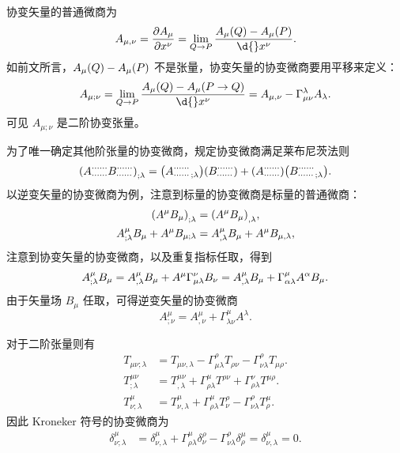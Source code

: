 \documentclass[UTF8, 12pt, a4paper, oneside, onecolumn, fontset=none]{ctexart}
\begin{document}
协变矢量的普通微商为
\begin{equation}
A_{\mu,\nu}=\frac{\partial{}A_{\mu}}{\partial{}x^{\nu}}=\lim_{Q\to P}\frac{A_{\mu}\mleft(Q\mright)-A_{\mu}\mleft(P\mright)}{\d{}x^{\nu}}.
\end{equation}
如前文所言，$A_{\mu}\mleft(Q\mright)-A_{\mu}\mleft(P\mright)$ 不是张量，协变矢量的协变微商要用平移来定义：
\begin{equation}
A_{\mu;\nu}=\lim_{Q\to P}\frac{A_{\mu}\mleft(Q\mright)-A_{\mu}\mleft(P\to Q\mright)}{\d{}x^{\nu}}=A_{\mu,\nu}-\Gamma_{\mu\nu}^{\lambda}A_{\lambda}.
\end{equation}
可见 $A_{\mu;\nu}$ 是二阶协变张量。

为了唯一确定其他阶张量的协变微商，规定协变微商满足莱布尼茨法则
\begin{equation}
\mleft(A_{\cdots\cdots}^{\cdots\cdots}B_{\cdots\cdots}^{\cdots\cdots}\mright)_{;\lambda}=\mleft(A_{\cdots\cdots;\lambda}^{\cdots\cdots}\mright)\mleft(B_{\cdots\cdots}^{\cdots\cdots}\mright)+\mleft(A_{\cdots\cdots}^{\cdots\cdots}\mright)\mleft(B_{\cdots\cdots;\lambda}^{\cdots\cdots}\mright).
\end{equation}
以逆变矢量的协变微商为例，注意到标量的协变微商是标量的普通微商：
\begin{align}
\mleft(A^{\mu}B_{\mu}\mright)_{;\lambda}&=\mleft(A^{\mu}B_{\mu}\mright)_{,\lambda},\\
A_{;\lambda}^{\mu}B_{\mu}+A^{\mu}B_{\mu;\lambda}&=A_{,\lambda}^{\mu}B_{\mu}+A^{\mu}B_{\mu,\lambda},\notag
\end{align}
注意到协变矢量的协变微商，以及重复指标任取，得到
\begin{equation}
A_{;\lambda}^{\mu}B_{\mu}=A_{,\lambda}^{\mu}B_{\mu}+A^{\mu}\Gamma_{\mu\lambda}^{\nu}B_{\nu}=A^{\mu}_{,\lambda}B_{\mu}+\Gamma_{\alpha\lambda}^{\mu}A^{\alpha}B_{\mu}.\notag
\end{equation}
由于矢量场 $B_{\mu}$ 任取，可得逆变矢量的协变微商
\begin{equation}
A_{;\nu}^{\mu}=A_{,\nu}^{\mu}+\Gamma_{\lambda\nu}^{\mu}A^{\lambda}.
\end{equation}

对于二阶张量则有
\begin{align}
T_{\mu\nu;\lambda}&=T_{\mu\nu,\lambda}-\Gamma_{\mu\lambda}^{\rho}T_{\rho\nu}-\Gamma_{\nu\lambda}^{\rho}T_{\mu\rho}.\\
T_{;\lambda}^{\mu\nu}&=T_{,\lambda}^{\mu\nu}+\Gamma_{\rho\lambda}^{\mu}T^{\rho\nu}+\Gamma_{\rho\lambda}^{\nu}T^{\mu\rho}.\\
T_{\nu;\lambda}^{\mu}&=T_{\nu,\lambda}^{\mu}+\Gamma_{\rho\lambda}^{\mu}T_{\nu}^{\rho}-\Gamma_{\nu\lambda}^{\rho}T_{\rho}^{\mu}.
\end{align}
因此 Kroneker 符号的协变微商为
\begin{align}
\delta_{\nu;\lambda}^{\mu}&=\delta_{\nu,\lambda}^{\mu}+\Gamma_{\rho\lambda}^{\mu}\delta_{\nu}^{\rho}-\Gamma_{\nu\lambda}^{\rho}\delta_{\rho}^{\mu}=\delta_{\nu,\lambda}^{\mu}=0.
\end{align}
\end{document}
